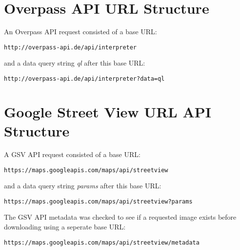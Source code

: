 \section{Overpass API URL Structure} \label{overpass-api-url-structure}

An Overpass API request consisted of a base URL: 

\begin{verbatim}
http://overpass-api.de/api/interpreter
\end{verbatim}

and a data query string \textit{ql} after this base URL:

\begin{verbatim}
http://overpass-api.de/api/interpreter?data=ql
\end{verbatim}

\section{Google Street View URL API Structure} \label{google-street-view-url-structure}

A GSV API request consisted of a base URL:

\begin{verbatim}
https://maps.googleapis.com/maps/api/streetview
\end{verbatim}

and a data query string \textit{params} after this base URL:

\begin{verbatim}
https://maps.googleapis.com/maps/api/streetview?params
\end{verbatim}

The GSV API metadata was checked to see if a requested image exists before downloading using a seperate base URL:

\begin{verbatim}
https://maps.googleapis.com/maps/api/streetview/metadata
\end{verbatim}